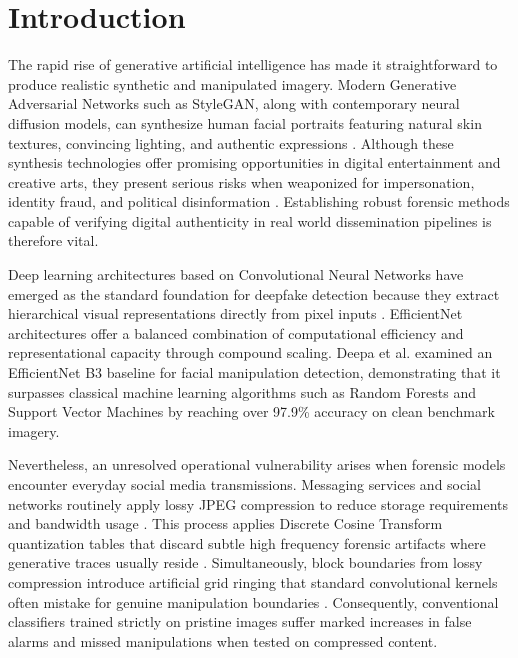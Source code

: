 \documentclass[conference]{IEEEtran}
\begin{document}
\section{Introduction}
The rapid rise of generative artificial intelligence has made it straightforward to produce realistic synthetic and manipulated imagery. Modern Generative Adversarial Networks such as StyleGAN, along with contemporary neural diffusion models, can synthesize human facial portraits featuring natural skin textures, convincing lighting, and authentic expressions \cite{goodfellow2014generative, karras2019style}. Although these synthesis technologies offer promising opportunities in digital entertainment and creative arts, they present serious risks when weaponized for impersonation, identity fraud, and political disinformation \cite{mirsky2021creation}. Establishing robust forensic methods capable of verifying digital authenticity in real world dissemination pipelines is therefore vital.

Deep learning architectures based on Convolutional Neural Networks have emerged as the standard foundation for deepfake detection because they extract hierarchical visual representations directly from pixel inputs \cite{tan2019efficientnet}. EfficientNet architectures offer a balanced combination of computational efficiency and representational capacity through compound scaling. Deepa et al. \cite{deepa2026enhanced} examined an EfficientNet B3 baseline for facial manipulation detection, demonstrating that it surpasses classical machine learning algorithms such as Random Forests and Support Vector Machines by reaching over 97.9\% accuracy on clean benchmark imagery.

Nevertheless, an unresolved operational vulnerability arises when forensic models encounter everyday social media transmissions. Messaging services and social networks routinely apply lossy JPEG compression to reduce storage requirements and bandwidth usage \cite{verdoliva2020media}. This process applies Discrete Cosine Transform quantization tables that discard subtle high frequency forensic artifacts where generative traces usually reside \cite{rossler2019faceforensics}. Simultaneously, block boundaries from lossy compression introduce artificial grid ringing that standard convolutional kernels often mistake for genuine manipulation boundaries \cite{bondi2020training}. Consequently, conventional classifiers trained strictly on pristine images suffer marked increases in false alarms and missed manipulations when tested on compressed content.
\end{document}
